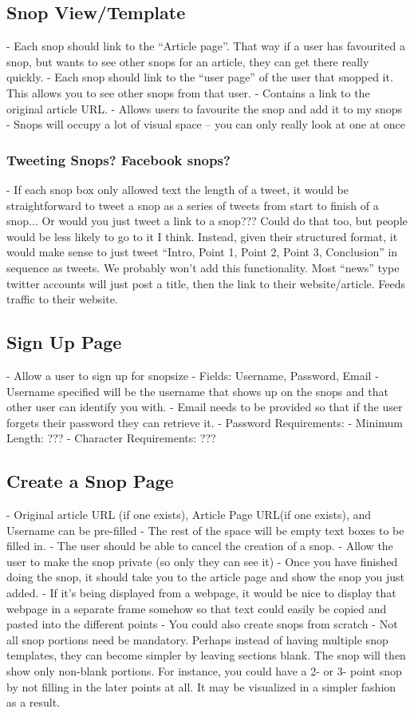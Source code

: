 \documentclass[11pt]{article}
\begin{document}
\subsection{Snop View/Template}
- Each snop should link to the “Article page”. That way if a user has favourited a snop, but wants to see other snops for an article, they can get there really quickly.
- Each snop should link to the “user page” of the user that snopped it. This allows you to see other snops from that user.
- Contains a link to the original article URL.
- Allows users to favourite the snop and add it to my snops
- Snops will occupy a lot of visual space -- you can only really look at one at once
\subsubsection{Tweeting Snops? Facebook snops?}
- If each snop box only allowed text the length of a tweet, it would be straightforward to tweet a snop as a series of tweets from start to finish of a snop... Or would you just tweet a link to a snop??? Could do that too, but people would be less likely to go to it I think. Instead, given their structured format, it would make sense to just tweet “Intro, Point 1, Point 2, Point 3, Conclusion” in sequence as tweets. We probably won’t add this functionality. Most “news” type twitter accounts will just post a title, then the link to their website/article. Feeds traffic to their website. 
\subsection{Sign Up Page}
- Allow a user to sign up for snopsize
- Fields: Username, Password, Email
- Username specified will be the username that shows up on the snops and that other user can identify you with.
- Email needs to be provided so that if the user forgets their password they can retrieve it.
- Password Requirements:
	- Minimum Length: ???
	- Character Requirements: ???
\subsection{Create a Snop Page}
- Original article URL (if one exists), Article Page URL(if one exists), and Username can be pre-filled
- The rest of the space will be empty text boxes to be filled in.
- The user should be able to cancel the creation of a snop.
- Allow the user to make the snop private (so only they can see it)
- Once you have finished doing the snop, it should take you to the article page and show the snop you just added.
- If it’s being displayed from a webpage, it would be nice to display that webpage in a separate frame somehow so that text could easily be copied and pasted into the different points
- You could also create snops from scratch
- Not all snop portions need be mandatory. Perhaps instead of having multiple snop templates, they can become simpler by leaving sections blank. The snop will then show only non-blank portions. For instance, you could have a 2- or 3- point snop by not filling in the later points at all. It may be visualized in a simpler fashion as a result.
\end{document}
